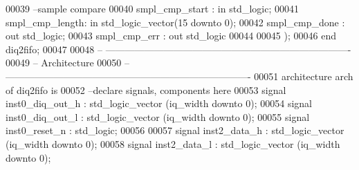 \begin{DoxyCode}
00039 \textcolor{keyword}{      --sample compare}
00040       \textcolor{vhdlchar}{smpl_cmp_start} \textcolor{vhdlchar}{:} \textcolor{keywordflow}{in} \textcolor{comment}{std\_logic};
00041       \textcolor{vhdlchar}{smpl_cmp_length}\textcolor{vhdlchar}{:} \textcolor{keywordflow}{in} \textcolor{comment}{std\_logic\_vector}\textcolor{vhdlchar}{(}\textcolor{vhdllogic}{}\textcolor{vhdllogic}{15} \textcolor{keywordflow}{downto} \textcolor{vhdllogic}{}\textcolor{vhdllogic}{0}\textcolor{vhdlchar}{)};
00042       \textcolor{vhdlchar}{smpl_cmp_done}  \textcolor{vhdlchar}{:} \textcolor{keywordflow}{out} \textcolor{comment}{std\_logic};
00043       \textcolor{vhdlchar}{smpl_cmp_err}   \textcolor{vhdlchar}{:} \textcolor{keywordflow}{out} \textcolor{comment}{std\_logic}
00044 
00045         \textcolor{vhdlchar}{)};
00046 \textcolor{keywordflow}{end} \textcolor{vhdlchar}{diq2fifo};
00047 
00048 \textcolor{keyword}{-- ----------------------------------------------------------------------------}
00049 \textcolor{keyword}{-- Architecture}
00050 \textcolor{keyword}{-- ----------------------------------------------------------------------------}
00051 \textcolor{keywordflow}{architecture} arch \textcolor{keywordflow}{of} diq2fifo is
00052 \textcolor{keyword}{--declare signals,  components here}
00053 \textcolor{keywordflow}{signal} \textcolor{vhdlchar}{inst0_diq_out_h}  \textcolor{vhdlchar}{:} \textcolor{comment}{std\_logic\_vector} \textcolor{vhdlchar}{(}\textcolor{vhdlchar}{iq_width} \textcolor{keywordflow}{downto} \textcolor{vhdllogic}{}\textcolor{vhdllogic}{0}\textcolor{vhdlchar}{)}; 
00054 \textcolor{keywordflow}{signal} \textcolor{vhdlchar}{inst0_diq_out_l}  \textcolor{vhdlchar}{:} \textcolor{comment}{std\_logic\_vector} \textcolor{vhdlchar}{(}\textcolor{vhdlchar}{iq_width} \textcolor{keywordflow}{downto} \textcolor{vhdllogic}{}\textcolor{vhdllogic}{0}\textcolor{vhdlchar}{)};
00055 \textcolor{keywordflow}{signal} \textcolor{vhdlchar}{inst0_reset_n}    \textcolor{vhdlchar}{:} \textcolor{comment}{std\_logic}; 
00056 
00057 \textcolor{keywordflow}{signal} \textcolor{vhdlchar}{inst2_data_h}     \textcolor{vhdlchar}{:} \textcolor{comment}{std\_logic\_vector} \textcolor{vhdlchar}{(}\textcolor{vhdlchar}{iq_width} \textcolor{keywordflow}{downto} \textcolor{vhdllogic}{}\textcolor{vhdllogic}{0}\textcolor{vhdlchar}{)};
00058 \textcolor{keywordflow}{signal} \textcolor{vhdlchar}{inst2_data_l}     \textcolor{vhdlchar}{:} \textcolor{comment}{std\_logic\_vector} \textcolor{vhdlchar}{(}\textcolor{vhdlchar}{iq_width} \textcolor{keywordflow}{downto} \textcolor{vhdllogic}{}\textcolor{vhdllogic}{0}\textcolor{vhdlchar}{)};

\end{DoxyCode}
